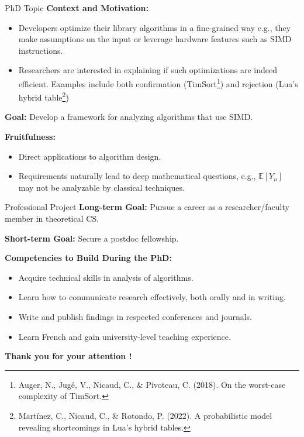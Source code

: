 \documentclass[xcolor=dvipsnames, aspectratio=169, 10pt]{beamer}
\begin{document}
\begin{frame}{PhD Topic}
  \textbf{Context and Motivation:}
  \begin{itemize}
    \item Developers optimize their library algorithms in a fine-grained way e.g., they make assumptions on the input or leverage hardware features such as SIMD instructions.
    \item Researchers are interested in explaining if such optimizations are indeed efficient. Examples include both confirmation (TimSort\footnote{Auger, N., Jugé, V., Nicaud, C., \& Pivoteau, C. (2018). On the worst-case complexity of TimSort.}) and rejection (Lua's hybrid table\footnote{Martínez, C., Nicaud, C., \& Rotondo, P. (2022). A probabilistic model revealing shortcomings in Lua’s hybrid tables.})
  \end{itemize}

  \textbf{Goal:} Develop a framework for analyzing algorithms that use SIMD.

  \textbf{Fruitfulness:}
  \begin{itemize}
    \item Direct applications to algorithm design.
    \item Requirements naturally lead to deep mathematical questions, e.g., $\mathbb{E}[Y_n]$ may not be analyzable by classical techniques.
  \end{itemize}
\end{frame}

\begin{frame}{Professional Project}
  \textbf{Long-term Goal:} Pursue a career as a researcher/faculty member in theoretical CS.

  \textbf{Short-term Goal:} Secure a postdoc fellowship.

  \textbf{Competencies to Build During the PhD:}
  \begin{itemize}
    \item Acquire technical skills in analysis of algorithms.
    \item Learn how to communicate research effectively, both orally and in writing.
    \item Write and publish findings in respected conferences and journals.
    \item Learn French and gain university-level teaching experience.
  \end{itemize}
\end{frame}


% 
% 
% 
% 
% 


\begin{frame}
  \begin{center}
    \Huge\textbf{Thank you for your attention !}
  \end{center}
\end{frame}


\end{document}
